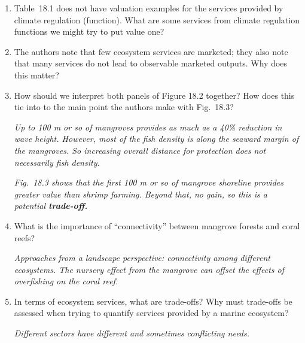 \documentclass[letterpaper]{tufte-handout}
\begin{document}
\begin{enumerate}
	\item Table~18.1 does not have valuation examples for the services provided by climate regulation (function). What are some services from climate regulation functions we might try to put value one? 

	\item The authors note that few ecosystem services are marketed; they also note that many services do not lead to observable marketed outputs. Why does this matter?
	
	
	\item How should we interpret both panels of Figure 18.2 together? How does this tie into to the main point the authors make with Fig.~18.3?
	
	\textit{Up to 100 m or so of mangroves provides as much as a 40\% reduction in wave height.  However, most of the fish density is along the seaward margin of the mangroves. So increasing overall distance for protection does not necessarily fish density. }
		
	\textit{Fig.~18.3 shows that the first 100 m or so of mangrove shoreline provides greater value than shrimp farming. Beyond that, no gain, so this is a potential \textbf{trade-off.}}
	
	\item What is the importance of “connectivity” between mangrove forests and coral reefs? 
	
	\textit{Approaches from a landscape perspective: connectivity among different ecosystems. The nursery effect from the mangrove can offset the effects of overfishing on the coral reef.}
	
	\item In terms of ecosystem services, what are trade-offs? Why must trade-offs 
	be assessed when trying to quantify services provided by a marine ecosystem?
	
	\textit{Different sectors have different and sometimes conflicting needs.}
	
	


\end{enumerate}
\end{document}
